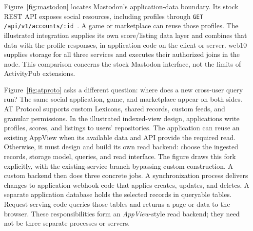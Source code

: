 \documentclass[sigconf, nonacm]{acmart}
\begin{document}
Figure~\ref{fig:mastodon} locates Mastodon's application-data boundary.
Its stock REST API exposes social resources, including profiles
through \texttt{GET /api/v1/accounts/:id}~\cite{mastodon-rest,mastodon-accounts}.
A game or marketplace can reuse those profiles. The illustrated
integration supplies its own score/listing data layer and combines that
data with the profile responses, in application code on the client or
server. web10 supplies storage for all three services and executes their
authorized joins in the node. This comparison concerns the stock
Mastodon interface, not the limits of ActivityPub extensions.

Figure~\ref{fig:atproto} asks a different question: where does a new
cross-user query run? The same social application, game, and marketplace
appear on both sides. AT Protocol supports custom Lexicons, shared records,
custom feeds, and granular permissions. In the illustrated indexed-view
design, applications write profiles, scores, and listings to users'
repositories. The application can reuse an existing AppView when its
available data and API provide the required read. Otherwise, it must
design and build its own read backend: choose the ingested records,
storage model, queries, and read interface. The figure draws this fork
explicitly, with the existing-service branch bypassing custom construction.
A custom backend then does three concrete jobs.
A synchronization process delivers changes to application webhook code
that applies creates, updates, and deletes. A separate application
database holds the selected records in queryable tables. Request-serving
code queries those tables and returns a page or data to the browser.
These responsibilities form an \emph{AppView}-style read backend; they
need not be three separate processes or servers.
\end{document}
